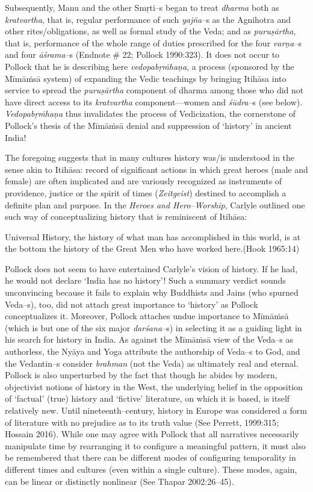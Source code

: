 Subsequently, Manu and the other Smṛti–s began to treat \textit{dharma} both as \textit{kratvartha}, that is, regular performance of such \textit{yajña–}s as the Agnihotra and other rites/obligations, as well as formal study of the Veda; and as \textit{puruṣārtha}, that is, performance of the whole range of duties prescribed for the four \textit{varṇa–}s and four \textit{āśrama–}s (Endnote \# 22; Pollock 1990:323). It does not occur to Pollock that he is describing here \textit{vedopabṛṁhaṇa}, a process (sponsored by the Mīmāṁsā system) of expanding the Vedic teachings by bringing Itihāsa into service to spread the \textit{puruṣārtha} component of dharma among those who did not have direct access to its \textit{kratvartha} component—women and \textit{śūdra–}s (see below). \textit{Vedopabṛṁhaṇa} thus invalidates the process of Vedicization, the cornerstone of Pollock’s thesis of the Mīmāṁsā denial and suppression of ‘history’ in ancient India! 

The foregoing suggests that in many cultures history was/is understood in the sense akin to Itihāsa: record of significant actions in which great heroes (male and female) are often implicated and are variously recognized as instruments of providence, justice or the spirit of times (\textit{Zeitgeist}) destined to accomplish a definite plan and purpose. In the \textit{Heroes and Hero–Worship}, Carlyle outlined one such way of conceptualizing history that is reminiscent of Itihāsa:

\begin{myquote}
Universal History, the history of what man has accomplished in this world, is at the bottom the history of the Great Men who have worked here.\hfill (Hook 1965:14)
\end{myquote}

Pollock does not seem to have entertained Carlyle’s vision of history. If he had, he would not declare ‘India has no history’! Such a summary verdict sounds unconvincing because it fails to explain why Buddhists and Jains (who spurned Veda–s), too, did not attach great importance to ‘history’ as Pollock conceptualizes it. Moreover, Pollock attaches undue importance to Mīmāṁsā (which is but one of the six major \textit{darśana–}s) in selecting it as a guiding light in his search for history in India. As against the Mīmāṁsā view of the Veda–s as authorless, the Nyāya and Yoga attribute the authorship of Veda–s to God, and the Vedantin–s consider \textit{brahman} (not the Veda) as ultimately real and eternal. Pollock is also unperturbed by the fact that though he abides by modern, objectivist notions of history in the West, the underlying belief in the opposition of ‘factual’ (true) history and ‘fictive’ literature, on which it is based, is itself relatively new. Until nineteenth–century, history in Europe was considered a form of literature with no prejudice as to its truth value (See Perrett, 1999:315; Hossain 2016). While one may agree with Pollock that all narratives necessarily manipulate time by rearranging it to configure a meaningful pattern, it must also be remembered that there can be different modes of configuring temporality in different times and cultures (even within a single culture). These modes, again, can be linear or distinctly nonlinear (See Thapar 2002:26–45).


